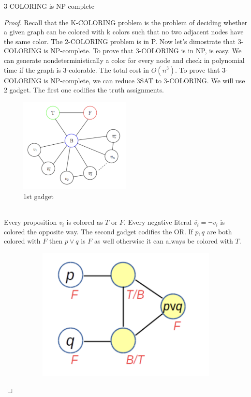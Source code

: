 \documentclass[12pt]{article}
\begin{document}
\begin{defbox}[Theorem]
  \textsc{3-COLORING} is NP-complete
\end{defbox}
\begin{proof}
  Recall that the \textsc{K-COLORING} problem is the problem of deciding whether a given graph can be colored with k colors such that no two adjacent nodes have the same color. The \textsc{2-COLORING} problem is in P. Now let's dimostrate that \textsc{3-COLORING} is NP-complete. To prove that \textsc{3-COLORING} is in NP, is easy. We can generate nondeterministically a color for every node and check in polynomial time if the graph is 3-colorable.
  The total cost in $O(n^3)$. To prove that \textsc{3-COLORING} is NP-complete, we can reduce \textsc{3SAT} to \textsc{3-COLORING}. We will use 2 gadget. The first one codifies the truth assignments.
  \\
  \begin{figure}[ht]
  \centering
  \includegraphics[width=0.5\textwidth]{img/3-coloring-1g.png}
  \caption{1st gadget}
  \end{figure}
  \\
   Every proposition $v_i$ is colored as $T$ or $F$. Every negative literal $\overline{v_i}=\neg v_i$ is colored the opposite way. The second gadget codifies the OR. If $p,q$ are both colored with $F$ then $p\vee q$ is $F$ as well otherwise it can always be colored with $T$.
   \\
   \begin{figure}[ht]
    \centering
    \begin{subfigure}[b]{0.3\textwidth}
        \includegraphics[width=\textwidth]{img/3-coloring-2g.png}

\end{subfigure}
\end{figure}
\end{proof}
\end{document}
